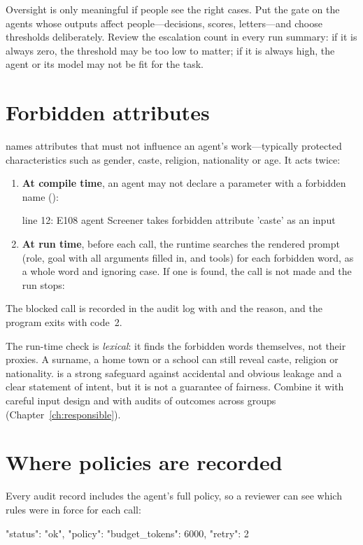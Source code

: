 \begin{ethics}
Oversight is only meaningful if people see the right cases. Put the gate on the agents whose outputs affect people---decisions, scores, letters---and choose thresholds deliberately. Review the escalation count in every run summary: if it is always zero, the threshold may be too low to matter; if it is always high, the agent or its model may not be fit for the task.
\end{ethics}

\section{Forbidden attributes}
\label{sec:forbid}

 names attributes that must not influence an agent's work---typically protected characteristics such as gender, caste, religion, nationality or age. It acts twice:

\begin{enumerate}
  \item \textbf{At compile time}, an agent may not declare a parameter with a forbidden name ():
\begin{terminal}
  line 12: E108 agent Screener takes forbidden attribute 'caste' as an input
\end{terminal}
  \item \textbf{At run time}, before each call, the runtime searches the rendered prompt (role, goal with all arguments filled in, and tools) for each forbidden word, as a whole word and ignoring case. If one is found, the call is not made and the run stops:
\end{enumerate}

The blocked call is recorded in the audit log with  and the reason, and the program exits with code~2.

\begin{caution}
The run-time check is \emph{lexical}: it finds the forbidden words themselves, not their proxies. A surname, a home town or a school can still reveal caste, religion or nationality.  is a strong safeguard against accidental and obvious leakage and a clear statement of intent, but it is not a guarantee of fairness. Combine it with careful input design and with audits of outcomes across groups (Chapter~\ref{ch:responsible}).
\end{caution}

\section{Where policies are recorded}

Every audit record includes the agent's full policy, so a reviewer can see which rules were in force for each call:

\begin{plaincode}[title=from an audit record]
"status": "ok",
"policy": {"budget_tokens": 6000, "retry": 2}
\end{plaincode}
